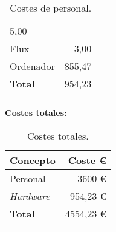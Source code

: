 \begin{longtable}[]{@{}lr@{}}
\begin{minipage}[t]{0.20\columnwidth}
5,00\strut
\end{minipage}\tabularnewline
\begin{minipage}[t]{0.38\columnwidth}\raggedright\strut
Flux\strut
\end{minipage} & \begin{minipage}[t]{0.20\columnwidth}\raggedleft\strut
3,00\strut
\end{minipage}\tabularnewline
\begin{minipage}[t]{0.38\columnwidth}\raggedright\strut
Ordenador\strut
\end{minipage} & \begin{minipage}[t]{0.20\columnwidth}\raggedleft\strut
855,47\strut
\end{minipage}\tabularnewline
\midrule
\begin{minipage}[t]{0.38\columnwidth}\raggedright\strut
\textbf{Total}\strut
\end{minipage} & \begin{minipage}[t]{0.20\columnwidth}\raggedleft\strut
954,23\strut
\end{minipage}\tabularnewline
\bottomrule
\caption{Costes de personal.}
\end{longtable}



\textbf{Costes totales:}

\begin{longtable}[]{@{}lr@{}}
\toprule
\begin{minipage}[b]{0.38\columnwidth}\raggedright\strut
\textbf{Concepto}\strut
\end{minipage} & \begin{minipage}[b]{0.20\columnwidth}\raggedleft\strut
\textbf{Coste \euro{}}\strut
\end{minipage}\tabularnewline
\midrule
\endhead
\begin{minipage}[t]{0.38\columnwidth}\raggedright\strut
Personal\strut
\end{minipage} & \begin{minipage}[t]{0.20\columnwidth}\raggedleft\strut
3600 \euro{}\strut
\end{minipage}\tabularnewline
\begin{minipage}[t]{0.38\columnwidth}\raggedright\strut
\emph{Hardware}\strut
\end{minipage} & \begin{minipage}[t]{0.20\columnwidth}\raggedleft\strut
954,23 \euro{}\strut
\end{minipage}\tabularnewline
\midrule
\begin{minipage}[t]{0.38\columnwidth}\raggedright\strut
\textbf{Total}\strut
\end{minipage} & \begin{minipage}[t]{0.20\columnwidth}\raggedleft\strut
4554,23 \euro{}\strut
\end{minipage}\tabularnewline
\bottomrule
\caption{Costes totales.}
\end{longtable}

